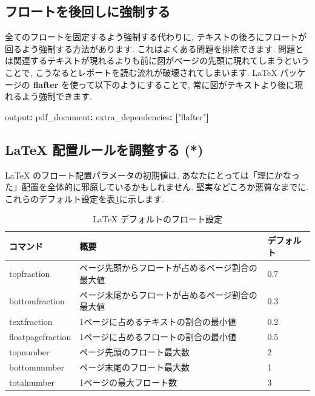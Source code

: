 \documentclass[
  11pt,
  lualatex,
  ja=standard]{bxjsreport}
\newenvironment{Shaded}{\begin{snugshade}}{\end{snugshade}}
\newcommand{\AttributeTok}[1]{\textcolor[rgb]{0.77,0.63,0.00}{#1}}
\newcommand{\FunctionTok}[1]{\textcolor[rgb]{0.00,0.00,0.00}{#1}}
\newcommand{\KeywordTok}[1]{\textcolor[rgb]{0.13,0.29,0.53}{\textbf{#1}}}
\newcommand{\StringTok}[1]{\textcolor[rgb]{0.31,0.60,0.02}{#1}}
\begin{document}
\hypertarget{force-floats-forward}{%
\subsection{フロートを後回しに強制する}\label{force-floats-forward}}

全てのフロートを固定するよう強制する代わりに, テキストの後ろにフロートが回るよう強制する方法があります. これはよくある問題を排除できます. 問題とは関連するテキストが現れるよりも前に図がページの先頭に現れてしまうということで, こうなるとレポートを読む流れが破壊されてしまいます. LaTeX パッケージの \textbf{flafter} を使って以下のようにすることで, 常に図がテキストより後に現れるよう強制できます.

\begin{Shaded}
\begin{Highlighting}[]
\FunctionTok{output}\KeywordTok{:}\AttributeTok{ }
\AttributeTok{  }\FunctionTok{pdf\_document}\KeywordTok{:}
\AttributeTok{    }\FunctionTok{extra\_dependencies}\KeywordTok{:}\AttributeTok{ }\KeywordTok{[}\StringTok{"flafter"}\KeywordTok{]}
\end{Highlighting}
\end{Shaded}

\hypertarget{latex-ux914dux7f6eux30ebux30fcux30ebux3092ux8abfux6574ux3059ux308b}{%
\subsection{LaTeX 配置ルールを調整する (*)}\label{latex-ux914dux7f6eux30ebux30fcux30ebux3092ux8abfux6574ux3059ux308b}}

LaTeX のフロート配置パラメータの初期値は, あなたにとっては「理にかなった」配置を全体的に邪魔しているかもしれません. 堅実などころか悪質なまでに. これらのデフォルト設定を表\ref{tab:float-default}に示します.

\begin{table}

\caption{\label{tab:float-default}LaTeX デフォルトのフロート設定}
\centering
\begin{tabular}[t]{l|l|l}
\hline
コマンド & 概要 & デフォルト\\
\hline
topfraction & ページ先頭からフロートが占めるページ割合の最大値 & 0.7\\
\hline
bottomfraction & ページ末尾からフロートが占めるページ割合の最大値 & 0.3\\
\hline
textfraction & 1ページに占めるテキストの割合の最小値 & 0.2\\
\hline
floatpagefraction & 1ページに占めるフロートの割合の最小値 & 0.5\\
\hline
topnumber & ページ先頭のフロート最大数 & 2\\
\hline
bottomnumber & ページ末尾のフロート最大数 & 1\\
\hline
totalnumber & 1ページの最大フロート数 & 3\\
\hline
\end{tabular}
\end{table}
\end{document}
